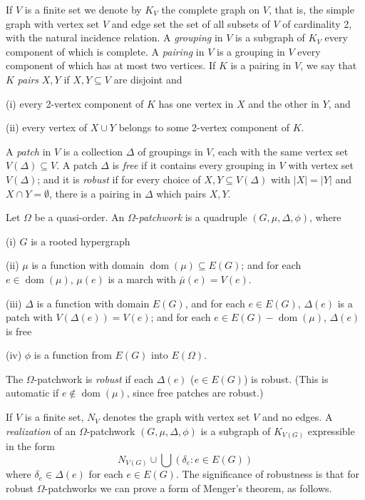 If $V$ is a finite set we denote by $K_V$ the complete graph on $V$, that is, the simple graph with vertex set $V$ and edge set the set of all subsets of $V$ of cardinality 2, with the natural incidence relation. A \textit{grouping} in $V$ is a subgraph of $K_V$ every component of which is complete. A \textit{pairing} in $V$ is a grouping in $V$ every component of which has at most two vertices. If $K$ is a pairing in $V$, we say that $K$ \textit{pairs} $X, Y$ if $X, Y \subseteq V$ are disjoint and

\hspace*{12pt}(i) every 2-vertex component of $K$ has one vertex in $X$ and the other in $Y$, and

\hspace*{12pt}(ii) every vertex of $X \cup Y$ belongs to some 2-vertex component of $K$.

A \textit{patch} in $V$ is a collection $\Delta$ of groupings in $V$, each with the same vertex set $V(\Delta) \subseteq V$. A patch $\Delta$ is \textit{free} if it contains every grouping in $V$ with vertex set $V(\Delta)$; and it is \textit{robust} if for every choice of $X, Y \subseteq V(\Delta)$ with $|X| = |Y|$ and $X \cap Y = \emptyset$, there is a pairing in $\Delta$ which pairs $X, Y$.

Let $\Omega$ be a quasi-order. An $\Omega$-\textit{patchwork} is a quadruple $(G, \mu, \Delta, \phi)$, where

\hspace*{12pt}(i) $G$ is a rooted hypergraph

\hspace*{12pt}(ii) $\mu$ is a function with domain $\operatorname{dom}(\mu) \subseteq E(G)$; and for each $e \in \operatorname{dom}(\mu)$, $\mu(e)$ is a march with $\bar{\mu}(e) = V(e)$.

\hspace*{12pt}(iii) $\Delta$ is a function with domain $E(G)$, and for each $e \in E(G)$, $\Delta(e)$ is a patch with $V(\Delta(e)) = V(e)$; and for each $e \in E(G) - \operatorname{dom}(\mu)$, $\Delta(e)$ is free

\hspace*{12pt}(iv) $\phi$ is a function from $E(G)$ into $E(\Omega)$.

The $\Omega$-patchwork is \textit{robust} if each $\Delta(e)$ ($e \in E(G)$) is robust. (This is automatic if $e \notin \operatorname{dom}(\mu)$, since free patches are robust.)

If $V$ is a finite set, $N_V$ denotes the graph with vertex set $V$ and no edges. A \textit{realization} of an $\Omega$-patchwork $(G, \mu, \Delta, \phi)$ is a subgraph of $K_{V(G)}$ expressible in the form
\begin{equation*}
N_{V(G)} \cup \bigcup (\delta_e: e \in E(G))
\end{equation*}
where $\delta_e \in \Delta(e)$ for each $e \in E(G)$. The significance of robustness is that for robust $\Omega$-patchworks we can prove a form of Menger's theorem, as follows.

